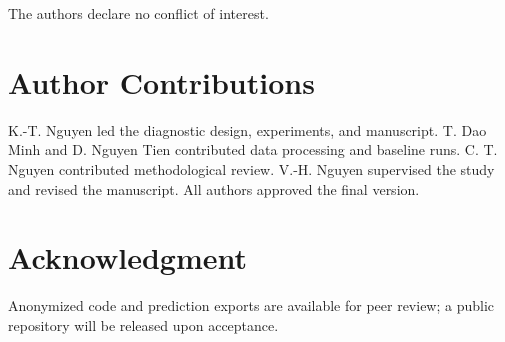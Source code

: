 \documentclass[journal,10pt,twocolumn]{IEEEtran}
\begin{document}
The authors declare no conflict of interest.

\section*{Author Contributions}

K.-T. Nguyen led the diagnostic design, experiments, and manuscript. T. Dao Minh and D. Nguyen Tien contributed data processing and baseline runs. C. T. Nguyen contributed methodological review. V.-H. Nguyen supervised the study and revised the manuscript. All authors approved the final version.

\section*{Acknowledgment}

Anonymized code and prediction exports are available for peer review; a public repository will be released upon acceptance.



\end{document}
